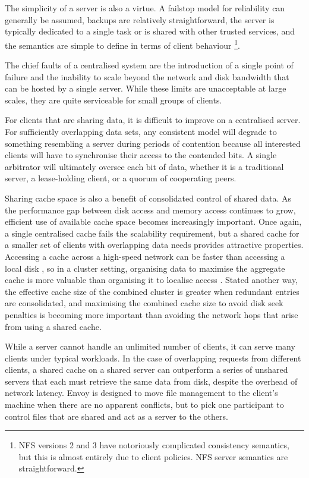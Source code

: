 The simplicity of a server is also a virtue. A failstop model for reliability can generally be assumed, backups are relatively straightforward, the server is typically dedicated to a single task or is shared with other trusted services, and the semantics are simple to define in terms of client behaviour%
\footnote{NFS versions 2 and 3 have notoriously complicated consistency semantics, but this is almost entirely due to client policies. NFS server semantics are straightforward.}.

The chief faults of a centralised system are the introduction of a single point of failure and the inability to scale beyond the network and disk bandwidth that can be hosted by a single server. While these limits are unacceptable at large scales, they are quite serviceable for small groups of clients.

For clients that are sharing data, it is difficult to improve on a centralised server. For sufficiently overlapping data sets, any consistent model will degrade to something resembling a server during periods of contention because all interested clients will have to synchronise their access to the contended bits. A single arbitrator will ultimately oversee each bit of data, whether it is a traditional server, a lease-holding client, or a quorum of cooperating peers.

Sharing cache space is also a benefit of consolidated control of shared data. As the performance gap between disk access and memory access continues to grow, efficient use of available cache space becomes increasingly important. Once again, a single centralised cache fails the scalability requirement, but a shared cache for a smaller set of clients with overlapping data needs provides attractive properties. Accessing a cache across a high-speed network can be faster than accessing a local disk \cite{dahlin94b}, so in a cluster setting, organising data to maximise the aggregate cache is more valuable than organising it to localise access \cite{franklin}. Stated another way, the effective cache size of the combined cluster is greater when redundant entries are consolidated, and maximising the combined cache size to avoid disk seek penalties is becoming more important than avoiding the network hops that arise from using a shared cache.

While a server cannot handle an unlimited number of clients, it can serve many clients under typical workloads. In the case of overlapping requests from different clients, a shared cache on a shared server can outperform a series of unshared servers that each must retrieve the same data from disk, despite the overhead of network latency. Envoy is designed to move file management to the client's machine when there are no apparent conflicts, but to pick one participant to control files that are shared and act as a server to the others.

